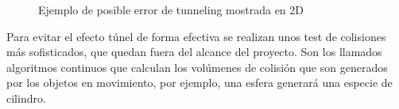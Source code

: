 \begin{figure}[!h]
	\centering	
	\hspace*{1cm}
	\caption{Ejemplo de posible error de tunneling mostrada en 2D}
\end{figure}

Para evitar el efecto túnel de forma efectiva se realizan unos test de colisiones más sofisticados, que quedan fuera del alcance del proyecto. Son los llamados algoritmos continuos que calculan los volúmenes de colisión que son generados por los objetos en movimiento, por ejemplo, una esfera generará una especie de cilindro.  